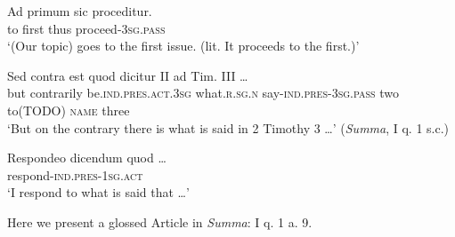 \documentclass[a4paper, oneside, 12pt]{report}
\newcommand*{\category}[1]{\textsc{#1}}
\newcommand{\translate}[1]{`#1'}
\newcommand{\literature}[1]{\textit{#1}}
\begin{document}
\begin{exe}
    \ex\label{ex:text.summa.intro.1} 
    \gll Ad primum sic proceditur. \\
    to first thus proceed-\category{3sg.pass} \\
    \translate{(Our topic) goes to the first issue. (lit. It proceeds to the first.)}
    
    \ex\label{ex:text.summa.intro.2} 
    \gll Sed contra est quod dicitur II ad Tim. III \dots \\ 
    but contrarily be.\category{ind}.\category{pres}.\category{act}.\category{3sg} 
    what.\category{r}.\category{sg.n} 
    say-\category{ind.pres}-\category{3sg.pass} two to(TODO) \category{name} three \\
    \glt \translate{But on the contrary there is what is said in 2 Timothy 3 \dots} 
    (\literature{Summa}, I q. 1 s.c.)

    \ex\label{ex:text.summa.intro.3} 
    \gll Respondeo dicendum quod \dots \\
    respond-\category{ind.pres}-\category{1sg.act} \\
    \glt \translate{I respond to what is said that \dots}
\end{exe}

Here we present a glossed Article in \literature{Summa}: I q. 1 a. 9.




\end{document}
